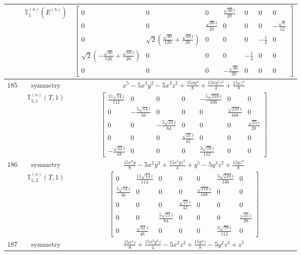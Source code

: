 \documentclass[fleqn,8pt,landscape]{jsarticle}
\begin{document}
\begin{longtable}{ccc}
$  $ & $ \mathbb{T}_{5}^{(a)}(E^{(b)}) $ & $ \begin{bmatrix} 0 & 0 & 0 & \frac{\sqrt{30} i}{20} & 0 & 0 & 0 \\ 0 & 0 & \frac{\sqrt{30} i}{20} & 0 & 0 & 0 & - \frac{\sqrt{6}}{12} \\ 0 & \sqrt{2} \left(\frac{\sqrt{30}}{120} + \frac{\sqrt{10} i}{20}\right) & 0 & 0 & 0 & - \frac{1}{4} & 0 \\ \sqrt{2} \left(- \frac{\sqrt{30}}{120} + \frac{\sqrt{10} i}{20}\right) & 0 & 0 & 0 & - \frac{1}{4} & 0 & 0 \\ 0 & 0 & 0 & - \frac{\sqrt{30}}{20} & 0 & 0 & 0 \end{bmatrix} $ \\ \hline
$ 185 $ & $ \text{symmetry} $ & $ x^{5} - 5 x^{3} y^{2} - 5 x^{3} z^{2} + \frac{15 x y^{4}}{8} + \frac{15 x y^{2} z^{2}}{4} + \frac{15 x z^{4}}{8} $ \\
$  $ & $ \mathbb{T}_{5,1}^{(a)}(T,1) $ & $ \begin{bmatrix} \frac{11 \sqrt{14} i}{112} & 0 & 0 & 0 & - \frac{5 \sqrt{210} i}{336} & 0 & 0 \\ 0 & - \frac{5 \sqrt{14} i}{56} & 0 & 0 & 0 & \frac{\sqrt{210} i}{168} & 0 \\ 0 & 0 & - \frac{5 \sqrt{21} i}{84} & 0 & 0 & 0 & \frac{\sqrt{35} i}{28} \\ 0 & 0 & 0 & \frac{\sqrt{21} i}{42} & 0 & 0 & 0 \\ - \frac{\sqrt{42} i}{48} & 0 & 0 & 0 & \frac{3 \sqrt{70} i}{112} & 0 & 0 \end{bmatrix} $ \\ \hline
$ 186 $ & $ \text{symmetry} $ & $ \frac{15 x^{4} y}{8} - 5 x^{2} y^{3} + \frac{15 x^{2} y z^{2}}{4} + y^{5} - 5 y^{3} z^{2} + \frac{15 y z^{4}}{8} $ \\
$  $ & $ \mathbb{T}_{5,2}^{(a)}(T,1) $ & $ \begin{bmatrix} 0 & \frac{11 \sqrt{14} i}{112} & 0 & 0 & 0 & \frac{5 \sqrt{210} i}{336} & 0 \\ \frac{5 \sqrt{14} i}{56} & 0 & 0 & 0 & \frac{\sqrt{210} i}{168} & 0 & 0 \\ 0 & 0 & 0 & \frac{\sqrt{21} i}{42} & 0 & 0 & 0 \\ 0 & 0 & \frac{5 \sqrt{21} i}{84} & 0 & 0 & 0 & \frac{\sqrt{35} i}{28} \\ 0 & \frac{\sqrt{42} i}{48} & 0 & 0 & 0 & \frac{3 \sqrt{70} i}{112} & 0 \end{bmatrix} $ \\ \hline
$ 187 $ & $ \text{symmetry} $ & $ \frac{15 x^{4} z}{8} + \frac{15 x^{2} y^{2} z}{4} - 5 x^{2} z^{3} + \frac{15 y^{4} z}{8} - 5 y^{2} z^{3} + z^{5} $ \\

\end{longtable}
\end{document}
